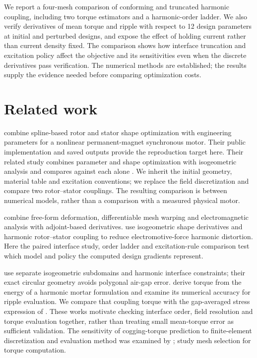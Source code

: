 \documentclass{anvil-paper}
\begin{document}
We report a four-mesh comparison of conforming and truncated harmonic
coupling, including two torque estimators and a harmonic-order ladder.
We also verify derivatives of mean torque and ripple with respect to
12 design parameters at initial and perturbed designs, and expose the
effect of holding current rather than current density fixed. The
comparison shows how interface truncation and excitation policy affect
the objective and its sensitivities even when the discrete derivatives pass
verification. The numerical methods are established; the results supply
the evidence needed before comparing optimization costs.

\section{Related work}
\citet{wiesheu2024spline} combine spline-based rotor and stator shape
optimization with engineering parameters for a nonlinear permanent-magnet
synchronous motor. Their public implementation and saved outputs provide
the reproduction target here. Their related study combines parameter and
shape optimization with isogeometric analysis and compares against each alone
\citep{wiesheu2025combined}. We inherit the initial geometry, material
table and excitation conventions; we replace the field discretization and compare two
rotor--stator couplings. The resulting comparison is between numerical
models, rather than a comparison with a measured physical motor.

\citet{scotzniovsky2025} combine free-form deformation, differentiable
mesh warping and electromagnetic analysis with adjoint-based derivatives.
\citet{merkel2021shape} use isogeometric shape derivatives and harmonic
rotor--stator coupling to reduce electromotive-force harmonic distortion.
Here the paired interface study, order ladder and excitation-rule comparison
test which model and policy the computed design gradients represent.

\citet{bontinck2018isogeometric} use separate isogeometric subdomains and
harmonic interface constraints; their exact circular geometry avoids
polygonal air-gap error. \citet{egger2022torque} derive torque from the
energy of a harmonic mortar formulation and examine its numerical
accuracy for ripple evaluation. We compare that coupling torque with the
gap-averaged stress expression of \citet{arkkio1987}. These works motivate
checking interface order, field resolution and torque evaluation together,
rather than treating small mean-torque error as sufficient validation.
The sensitivity of cogging-torque prediction to finite-element
discretization and evaluation method was examined by \citet{howe1992cogging};
\citet{arkkio2012proper} study mesh selection for torque computation.
\end{document}
